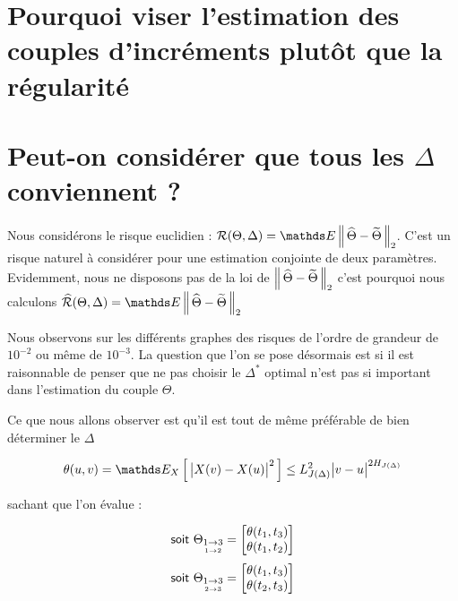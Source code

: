 \minitoc%

\section{Pourquoi viser l'estimation des couples d'incréments plutôt que la régularité}
\label{annexe:choix_risque_couple}


% 


\section{Peut-on considérer que tous les $\Delta$ conviennent ?}
\label{annexe:tous_theta_conviennent_borne_norme_theta}

Nous considérons le risque euclidien : $\mathcal R(\Theta, \Delta) = \mathds E \distnorme 2 {\widehat \Theta}{\widetilde \Theta}$. C'est un risque naturel à considérer pour une estimation conjointe de deux paramètres. Evidemment, nous ne disposons pas de la loi de $\left\lVert \, \widehat \Theta - \widetilde \Theta \, \right\rVert _ {2}$ c'est pourquoi nous calculons $\widehat {\mathcal R}(\Theta, \Delta) = \mathds E \distnorme 2 {\widehat \Theta}{\widetilde \Theta}$

Nous observons sur les différents graphes des risques de l'ordre de grandeur de $10^{-2}$ ou même de $10^{-3}$. La question que l'on se pose désormais est si il est raisonnable de penser que ne pas choisir le $\Delta^*$ optimal n'est pas si important dans l'estimation du couple $\Theta$.

Ce que nous allons observer est qu'il est tout de même préférable de bien déterminer le $\Delta$

\begin{equation}
	\theta(u,v) = \esperanceloi X { \bigl| X(v) - X(u) \bigr|^2 } \leq L_{J(\Delta)}^2 \bigl| v - u \bigr|^{2 H_{J(\Delta)}}
\end{equation}

sachant que l'on évalue :

\begin{equation}
	\textsf{soit }
	\Theta_{\underset{1 \rightarrow 2}{1 \rightarrow 3}} = \begin{bmatrix} \theta(t_1, t_3) \\ \theta(t_1, t_2) \end{bmatrix}
\end{equation}
\begin{equation}
	\textsf{soit }
	\Theta_{\underset{2 \rightarrow 3}{1 \rightarrow 3}} = \begin{bmatrix} \theta(t_1, t_3) \\ \theta(t_2, t_3) \end{bmatrix}
\end{equation}



